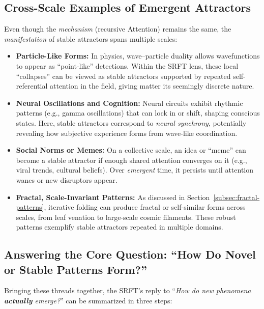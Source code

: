\documentclass[12pt,a4paper]{article}
\begin{document}
\subsection{Cross-Scale Examples of Emergent Attractors}
\label{subsec:cross-scale-attractors}

Even though the \emph{mechanism} (recursive Attention) remains the same, the
\emph{manifestation} of stable attractors spans multiple scales:

\begin{itemize}
    \item \textbf{Particle-Like Forms:}  
    In physics, wave--particle duality allows wavefunctions to appear as “point-like”
    detections. Within the SRFT lens, these local “collapses” can be viewed as stable
    attractors supported by repeated self-referential attention in the field, giving
    matter its seemingly discrete nature.

    \item \textbf{Neural Oscillations and Cognition:}  
    Neural circuits exhibit rhythmic patterns (e.g., gamma oscillations) that can lock
    in or shift, shaping conscious states. Here, stable attractors correspond to
    \emph{neural synchrony}, potentially revealing how subjective experience forms
    from wave-like coordination.

    \item \textbf{Social Norms or Memes:}  
    On a collective scale, an idea or “meme” can become a stable attractor if enough
    shared attention converges on it (e.g., viral trends, cultural beliefs). Over
    \emph{emergent} time, it persists until attention wanes or new disruptors appear.

    \item \textbf{Fractal, Scale-Invariant Patterns:}  
    As discussed in Section~\ref{subsec:fractal-patterns}, iterative folding can produce
    fractal or self-similar forms across scales, from leaf venation to large-scale cosmic
    filaments. These robust patterns exemplify stable attractors repeated in multiple
    domains.
\end{itemize}

\subsection{Answering the Core Question: ``How Do Novel or Stable Patterns Form?''}
\label{subsec:how-they-form}

Bringing these threads together, the SRFT’s reply to “\emph{How do new phenomena
\textbf{actually} emerge?}” can be summarized in three steps:
\end{document}
